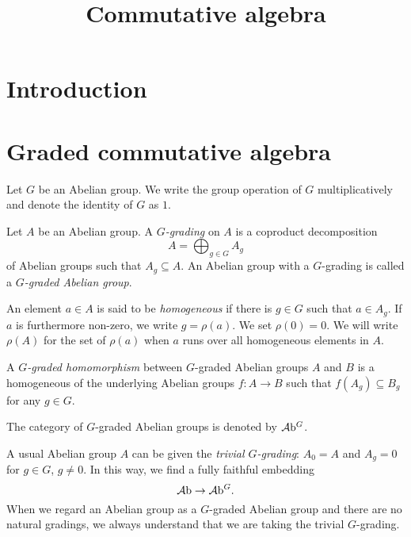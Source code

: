 
\title{Commutative algebra}

\maketitle
\tableofcontents



\section{Introduction}\label{sec-introduction}

\section{Graded commutative algebra}
Let $G$ be an Abelian group. We write the group operation of $G$ multiplicatively and denote the identity of $G$ as $1$.

\begin{definition}
    Let $A$ be an Abelian group. A \emph{$G$-grading} on $A$ is a coproduct decomposition
    \[
        A=\bigoplus_{g\in G}A_g  
    \]
    of Abelian groups such that $A_g\subseteq A$. An Abelian group with a $G$-grading is called a \emph{$G$-graded Abelian group}. 

    An element $a\in A$ is said to be \emph{homogeneous} if there is $g\in G$ such that $a\in A_g$. If $a$ is furthermore non-zero, we write $g=\rho(a)$. We set $\rho(0)=0$. We will write $\rho(A)$ for the set of $\rho(a)$ when $a$ runs over all homogeneous elements in $A$.

    A \emph{$G$-graded homomorphism} between $G$-graded Abelian groups $A$ and $B$ is a homogeneous of the underlying Abelian groups $f:A\rightarrow B$ such that $f(A_g)\subseteq B_g$ for any $g\in G$.

    The category of $G$-graded Abelian groups is denoted by $\mathcal{A}\mathrm{b}^G$.
\end{definition}
A usual Abelian group $A$ can be given the \emph{trivial $G$-grading}: $A_0=A$ and $A_g=0$ for $g\in G$, $g\neq 0$. In this way, we find a fully faithful embedding 
\[
    \mathcal{A}\mathrm{b}\rightarrow \mathcal{A}\mathrm{b}^G.  
\]
When we regard an Abelian group as a $G$-graded Abelian group and there are no natural gradings, we always understand that we are taking the trivial $G$-grading.


